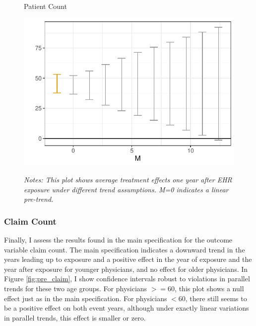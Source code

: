 \documentclass[12pt]{article}
\begin{document}
\begin{figure}[ht]
    \centering
    \captionsetup{width=.5\linewidth}
    \caption{Patient Count}
    \includegraphics[scale=.5]{Objects/patient_pretrends_plot.pdf}
    \label{fig:pre_patient}
    \vspace{2mm}
    \caption*{\footnotesize{\textit{Notes: This plot shows average treatment effects one year after EHR exposure under different trend assumptions. M=0 indicates a linear pre-trend.}}}
\end{figure}

\subsubsection{Claim Count}

Finally, I assess the results found in the main specification for the outcome variable claim count. The main specification indicates a downward trend in the years leading up to exposure and a positive effect in the year of exposure and the year after exposure for younger physicians, and no effect for older physicians. In Figure \ref{fig:pre_claim}, I show confidence intervals robust to violations in parallel trends for these two age groups. For physicians $>= 60$, this plot shows a null effect just as in the main specification. For physicians $< 60$, there still seems to be a positive effect on both event years, although under exactly linear variations in parallel trends, this effect is smaller or zero.  
\end{document}
